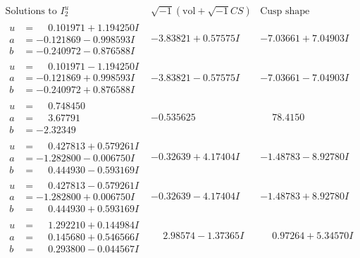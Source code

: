 \documentclass[1p]{elsarticle_modified}
\theoremstyle{definition}
\newcommand{\I}{\sqrt{-1}}
\begin{document}
$$\begin{array}{c|c|c}  
\text{Solutions to }I^u_{2}& \I (\text{vol} + \sqrt{-1}CS) & \text{Cusp shape}\\
 \hline 
\begin{aligned}
u &= \phantom{-}0.101971 + 1.194250 I \\
a &= -0.121869 - 0.998593 I \\
b &= -0.240972 - 0.876588 I\end{aligned}
 & -3.83821 + 0.57575 I & -7.03661 + 7.04903 I \\ \hline\begin{aligned}
u &= \phantom{-}0.101971 - 1.194250 I \\
a &= -0.121869 + 0.998593 I \\
b &= -0.240972 + 0.876588 I\end{aligned}
 & -3.83821 - 0.57575 I & -7.03661 - 7.04903 I \\ \hline\begin{aligned}
u &= \phantom{-}0.748450\phantom{ +0.000000I} \\
a &= \phantom{-}3.67791\phantom{ +0.000000I} \\
b &= -2.32349\phantom{ +0.000000I}\end{aligned}
 & -0.535625\phantom{ +0.000000I} & \phantom{-}78.4150\phantom{ +0.000000I} \\ \hline\begin{aligned}
u &= \phantom{-}0.427813 + 0.579261 I \\
a &= -1.282800 - 0.006750 I \\
b &= \phantom{-}0.444930 - 0.593169 I\end{aligned}
 & -0.32639 + 4.17404 I & -1.48783 - 8.92780 I \\ \hline\begin{aligned}
u &= \phantom{-}0.427813 - 0.579261 I \\
a &= -1.282800 + 0.006750 I \\
b &= \phantom{-}0.444930 + 0.593169 I\end{aligned}
 & -0.32639 - 4.17404 I & -1.48783 + 8.92780 I \\ \hline\begin{aligned}
u &= \phantom{-}1.292210 + 0.144984 I \\
a &= \phantom{-}0.145680 + 0.546566 I \\
b &= \phantom{-}0.293800 - 0.044567 I\end{aligned}
 & \phantom{-}2.98574 - 1.37365 I & \phantom{-}0.97264 + 5.34570 I \\ \hline\begin{aligned}

\end{aligned}
\end{array}$$
\end{document}
